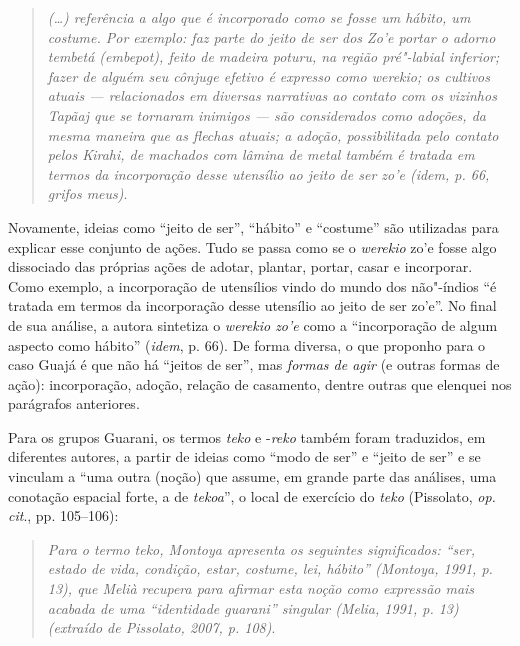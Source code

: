 \begin{quote}
\emph{(\ldots{}) referência a algo que é incorporado como se fosse um hábito,
um costume. Por exemplo: faz parte do \emph{jeito de ser dos Zo'e}
portar o adorno tembetá (\emph{embepot}), feito de madeira poturu, na
região pré"-labial inferior; fazer de alguém seu cônjuge efetivo é
expresso como \emph{werekio}; os cultivos atuais --- relacionados em
diversas narrativas ao contato com os vizinhos \emph{Tapãaj} que se
tornaram inimigos --- são considerados como adoções, da mesma maneira que
as flechas atuais; a adoção, possibilitada pelo contato pelos
\emph{Kirahi}, de machados com lâmina de metal também é tratada em
termos da incorporação desse utensílio ao jeito de ser zo'e (\emph{idem}, p. 66, grifos meus)}.
\end{quote}

Novamente, ideias como ``jeito de ser'', ``hábito'' e ``costume'' são
utilizadas para explicar esse conjunto de ações. Tudo se passa como se o
\emph{werekio} zo'e fosse algo dissociado das próprias ações de adotar,
plantar, portar, casar e incorporar. Como exemplo, a incorporação de
utensílios vindo do mundo dos não"-índios ``é tratada em termos da
incorporação desse utensílio ao jeito de ser zo'e''. No final de sua
análise, a autora sintetiza o \emph{werekio zo'e} como a ``incorporação
de algum aspecto como hábito'' (\emph{idem}, p. 66). De forma diversa, o que
proponho para o caso Guajá é que não há ``jeitos de ser'', mas
\emph{formas de agir} (e outras formas de ação): incorporação, adoção,
relação de casamento, dentre outras que elenquei nos parágrafos
anteriores.

Para os grupos Guarani, os termos \emph{teko} e -\emph{reko} também
foram traduzidos, em diferentes autores, a partir de ideias como ``modo
de ser'' e ``jeito de ser'' e se vinculam a ``uma outra (noção) que assume,
em grande parte das análises, uma conotação espacial forte, a de
\emph{tekoa}'', o local de exercício do \emph{teko} (Pissolato, \emph{op. cit}.,
pp. 105--106):

\begin{quote}
\emph{Para o termo \emph{teko}, Montoya apresenta os seguintes significados:
``ser, estado de vida, condição, estar, costume, lei, hábito'' (Montoya,
1991, p. 13), que Melià recupera para afirmar esta noção como expressão
mais acabada de uma ``identidade guarani'' singular (Melia, 1991, p. 13)
(extraído de Pissolato, 2007, p. 108)}.
\end{quote}

